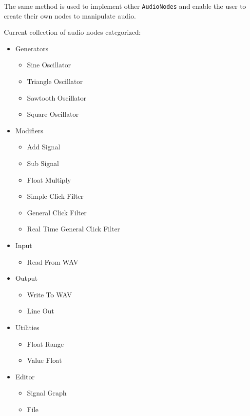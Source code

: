 \documentclass[conference]{IEEEtran}
\begin{document}
The same method is used to implement other \texttt{AudioNodes} and enable the user to create their own nodes to manipulate audio.

Current collection of audio nodes categorized:
\begin{itemize}
    \item Generators
        \begin{itemize}
            \item Sine Oscillator
            \item Triangle Oscillator
            \item Sawtooth Oscillator
            \item Square Oscillator

        \end{itemize}
    \item Modifiers
        \begin{itemize}
            \item Add Signal
            \item Sub Signal
            \item Float Multiply
            \item Simple Click Filter
            \item General Click Filter
            \item Real Time General Click Filter
        \end{itemize}
    \item Input
        \begin{itemize}
            \item Read From WAV
        \end{itemize}
    \item Output
        \begin{itemize}
            \item Write To WAV
            \item Line Out
        \end{itemize}
    \item Utilities
        \begin{itemize}
            \item Float Range
            \item Value Float
        \end{itemize}        
    \item Editor
        \begin{itemize}
            \item Signal Graph
            \item File
        \end{itemize}
\end{itemize}
\end{document}
